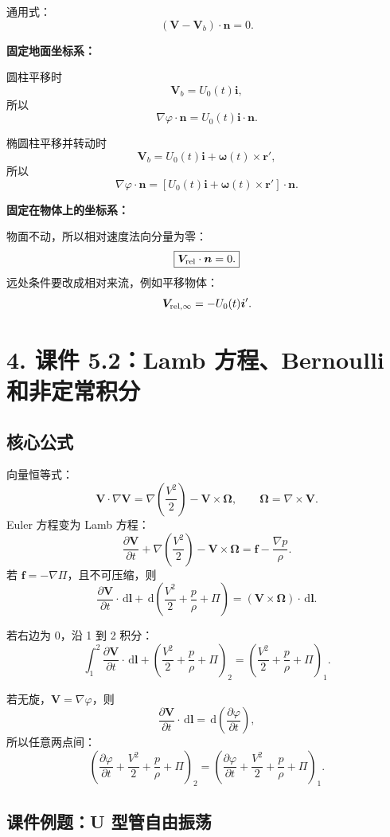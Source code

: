 ﻿\documentclass[UTF8,zihao=-4]{ctexart}
\newcommand{\dd}{\,\mathrm d}
\begin{document}
通用式：
\[
\boxed{(\bm V-\bm V_b)\cdot\bm n=0.}
\]

\textbf{固定地面坐标系：}

圆柱平移时
\[
\bm V_b=U_0(t)\bm i,
\]
所以
\[
\boxed{\nabla\varphi\cdot\bm n=U_0(t)\bm i\cdot\bm n.}
\]

椭圆柱平移并转动时
\[
\bm V_b=U_0(t)\bm i+\bm\omega(t)\times\bm r',
\]
所以
\[
\boxed{
\nabla\varphi\cdot\bm n
=\left[U_0(t)\bm i+\bm\omega(t)\times\bm r'\right]\cdot\bm n.}
\]

\textbf{固定在物体上的坐标系：}

物面不动，所以相对速度法向分量为零：
\[
\boxed{\bm V_{\rm rel}\cdot\bm n=0.}
\]
远处条件要改成相对来流，例如平移物体：
\[
\bm V_{\rm rel,\infty}=-U_0(t)\bm i'.
\]

\section*{4. 课件 5.2：Lamb 方程、Bernoulli 和非定常积分}

\subsection*{核心公式}

向量恒等式：
\[
\bm V\cdot\nabla\bm V
=\nabla\left(\frac{V^2}{2}\right)-\bm V\times\bm\Omega,
\qquad \bm\Omega=\nabla\times\bm V.
\]
Euler 方程变为 Lamb 方程：
\[
\boxed{
\frac{\partial\bm V}{\partial t}
+\nabla\left(\frac{V^2}{2}\right)
-\bm V\times\bm\Omega
=\bm f-\frac{\nabla p}{\rho}.}
\]
若 \(\bm f=-\nabla\Pi\)，且不可压缩，则
\[
\frac{\partial\bm V}{\partial t}\cdot\dd\bm l
+\dd\left(\frac{V^2}{2}+\frac p\rho+\Pi\right)
=(\bm V\times\bm\Omega)\cdot\dd\bm l.
\]

若右边为 0，沿 1 到 2 积分：
\[
\boxed{
\int_1^2\frac{\partial\bm V}{\partial t}\cdot\dd\bm l
+\left(\frac{V^2}{2}+\frac p\rho+\Pi\right)_2
=
\left(\frac{V^2}{2}+\frac p\rho+\Pi\right)_1.}
\]

若无旋，\(\bm V=\nabla\varphi\)，则
\[
\frac{\partial\bm V}{\partial t}\cdot\dd\bm l
=\dd\left(\frac{\partial\varphi}{\partial t}\right),
\]
所以任意两点间：
\[
\boxed{
\left(\frac{\partial\varphi}{\partial t}
+\frac{V^2}{2}+\frac p\rho+\Pi\right)_2
=
\left(\frac{\partial\varphi}{\partial t}
+\frac{V^2}{2}+\frac p\rho+\Pi\right)_1.}
\]

\subsection*{课件例题：U 型管自由振荡}
\end{document}
